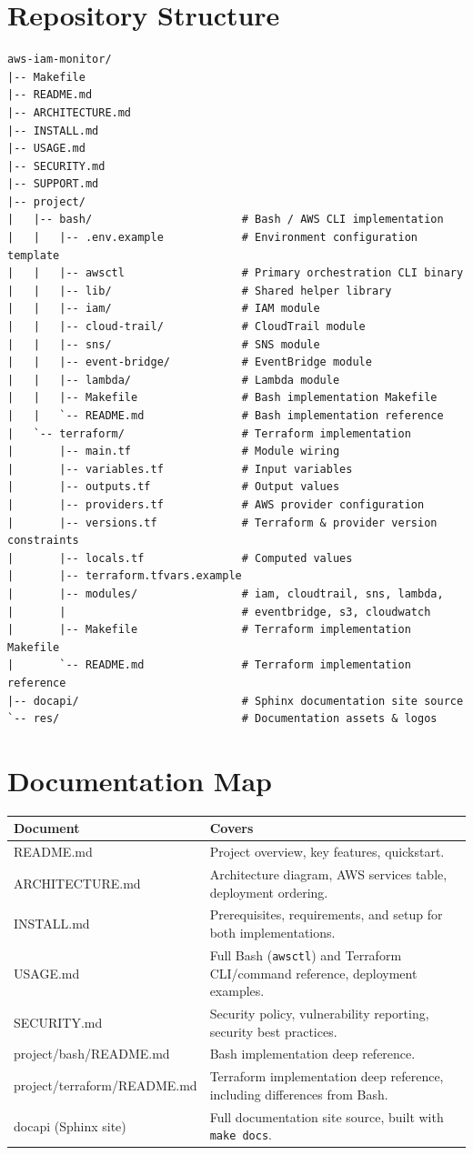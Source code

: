 \documentclass[11pt,a4paper]{report}
\newcommand{\techtable}[3]{%
\begin{center}
\renewcommand{\arraystretch}{1.3}
\begin{tabularx}{\linewidth}{l X}
\toprule
\textbf{#2} & \textbf{#3} \\
\midrule
#1
\bottomrule
\end{tabularx}
\end{center}
}
\begin{document}
\section{Repository Structure}

\begin{lstlisting}
aws-iam-monitor/
|-- Makefile
|-- README.md
|-- ARCHITECTURE.md
|-- INSTALL.md
|-- USAGE.md
|-- SECURITY.md
|-- SUPPORT.md
|-- project/
|   |-- bash/                       # Bash / AWS CLI implementation
|   |   |-- .env.example            # Environment configuration template
|   |   |-- awsctl                  # Primary orchestration CLI binary
|   |   |-- lib/                    # Shared helper library
|   |   |-- iam/                    # IAM module
|   |   |-- cloud-trail/            # CloudTrail module
|   |   |-- sns/                    # SNS module
|   |   |-- event-bridge/           # EventBridge module
|   |   |-- lambda/                 # Lambda module
|   |   |-- Makefile                # Bash implementation Makefile
|   |   `-- README.md               # Bash implementation reference
|   `-- terraform/                  # Terraform implementation
|       |-- main.tf                 # Module wiring
|       |-- variables.tf            # Input variables
|       |-- outputs.tf              # Output values
|       |-- providers.tf            # AWS provider configuration
|       |-- versions.tf             # Terraform & provider version constraints
|       |-- locals.tf               # Computed values
|       |-- terraform.tfvars.example
|       |-- modules/                # iam, cloudtrail, sns, lambda,
|       |                           # eventbridge, s3, cloudwatch
|       |-- Makefile                # Terraform implementation Makefile
|       `-- README.md               # Terraform implementation reference
|-- docapi/                         # Sphinx documentation site source
`-- res/                            # Documentation assets & logos
\end{lstlisting}

\section{Documentation Map}

\techtable{
README.md & Project overview, key features, quickstart. \\
ARCHITECTURE.md & Architecture diagram, AWS services table, deployment ordering. \\
INSTALL.md & Prerequisites, requirements, and setup for both implementations. \\
USAGE.md & Full Bash (\texttt{awsctl}) and Terraform CLI/command reference, deployment examples. \\
SECURITY.md & Security policy, vulnerability reporting, security best practices. \\
project/bash/README.md & Bash implementation deep reference. \\
project/terraform/README.md & Terraform implementation deep reference, including differences from Bash. \\
docapi (Sphinx site) & Full documentation site source, built with \texttt{make docs}. \\
}{Document}{Covers}
\end{document}
